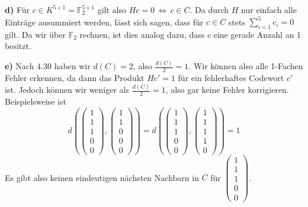 \documentclass[a4paper,graphics,11pt]{article}
\newcommand{\vect}[5]{\begin{pmatrix}#1\\#2\\#3\\#4\\#5\end{pmatrix}}
\begin{document}
\textbf{d)}
Für $c \in K^{5\times 1} = \mathbb{F}_2^{5\times 1}$ gilt also $Hc = 0 \,\Longleftrightarrow\,c \in C$.
Da durch $H$ nur einfach alle Einträge ausummiert werden, lässt sich sagen, dass für $c \in C$ stets
$\sum_{i=1}^{5} c_i = 0$ gilt. Da wir über $\mathbb{F}_2$ rechnen, ist dies analog dazu, dass $c$ eine gerade
Anzahl an 1 besitzt.

\textbf{e)}
Nach 4.30 haben wir $d(C) = 2$, also $\frac{d(C)}{2} = 1$. Wir können also alle 1-Fachen Fehler erkennen, da dann
das Produkt $Hc' = 1$ für ein fehlerhaftes Codewort $c'$ ist. Jedoch können wir weniger als $\frac{d(C)}{2} = 1$,
also gar keine Fehler korrigieren. Beispielsweise ist
$$
    d(\vect{1}{1}{1}{0}{0}, \vect{1}{1}{0}{0}{0}) = d(\vect{1}{1}{1}{0}{0}, \vect{1}{1}{1}{1}{0}) = 1
$$
Es gibt also keinen eindeutigen nächsten Nachbarn in $C$ für $\vect{1}{1}{1}{0}{0}$.
\end{document}
